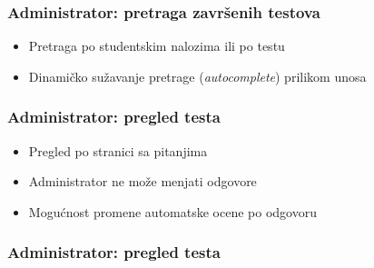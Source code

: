 \documentclass[compress,12pt,hyperref=unicode]{beamer}
\begin{document}
\begin{frame}
\frametitle{Administrator: pretraga završenih testova}
\begin{itemize}
\item Pretraga po studentskim nalozima ili po testu
\item Dinamičko sužavanje pretrage (\textit{autocomplete}) prilikom unosa
\end{itemize}
\end{frame}

\begin{frame}
\frametitle{Administrator: pregled testa}
\begin{itemize}
\item Pregled po stranici sa pitanjima
\item Administrator \alert{ne može} menjati odgovore
\item Mogućnost promene automatske ocene po odgovoru
\end{itemize}
\end{frame}

\begin{frame}
\frametitle{Administrator: pregled testa}
\centering
{}
\end{frame}
\end{document}
